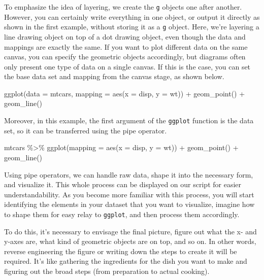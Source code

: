 \documentclass[
  a4paper,
]{book}
\newenvironment{Shaded}{\begin{snugshade}}{\end{snugshade}}
\newcommand{\AttributeTok}[1]{\textcolor[rgb]{0.40,0.45,0.13}{#1}}
\newcommand{\FunctionTok}[1]{\textcolor[rgb]{0.28,0.35,0.67}{#1}}
\newcommand{\NormalTok}[1]{\textcolor[rgb]{0.00,0.23,0.31}{#1}}
\newcommand{\SpecialCharTok}[1]{\textcolor[rgb]{0.37,0.37,0.37}{#1}}
\begin{document}
To emphasize the idea of layering, we create the \texttt{g} objects one
after another. However, you can certainly write everything in one
object, or output it directly as shown in the first example, without
storing it as a \texttt{g} object. Here, we're layering a line drawing
object on top of a dot drawing object, even though the data and mappings
are exactly the same. If you want to plot different data on the same
canvas, you can specify the geometric objects accordingly, but diagrams
often only present one type of data on a single canvas. If this is the
case, you can set the base data set and mapping from the canvas stage,
as shown below.

\begin{Shaded}
\begin{Highlighting}[]
\FunctionTok{ggplot}\NormalTok{(}\AttributeTok{data =}\NormalTok{ mtcars, }\AttributeTok{mapping =} \FunctionTok{aes}\NormalTok{(}\AttributeTok{x =}\NormalTok{ disp, }\AttributeTok{y =}\NormalTok{ wt)) }\SpecialCharTok{+}
  \FunctionTok{geom\_point}\NormalTok{() }\SpecialCharTok{+}
  \FunctionTok{geom\_line}\NormalTok{()}
\end{Highlighting}
\end{Shaded}

Moreover, in this example, the first argument of the \texttt{ggplot}
function is the data set, so it can be transferred using the pipe
operator.

\begin{Shaded}
\begin{Highlighting}[]
\NormalTok{mtcars }\SpecialCharTok{\%\textgreater{}\%}
  \FunctionTok{ggplot}\NormalTok{(}\AttributeTok{mapping =} \FunctionTok{aes}\NormalTok{(}\AttributeTok{x =}\NormalTok{ disp, }\AttributeTok{y =}\NormalTok{ wt)) }\SpecialCharTok{+}
  \FunctionTok{geom\_point}\NormalTok{() }\SpecialCharTok{+}
  \FunctionTok{geom\_line}\NormalTok{()}
\end{Highlighting}
\end{Shaded}

Using pipe operators, we can handle raw data, shape it into the
necessary form, and visualize it. This whole process can be displayed on
our script for easier understandability. As you become more familiar
with this process, you will start identifying the elements in your
dataset that you want to visualize, imagine how to shape them for easy
relay to \texttt{ggplot}, and then process them accordingly.

To do this, it's necessary to envisage the final picture, figure out
what the x- and y-axes are, what kind of geometric objects are on top,
and so on. In other words, reverse engineering the figure or writing
down the steps to create it will be required. It's like gathering the
ingredients for the dish you want to make and figuring out the broad
steps (from preparation to actual cooking).
\end{document}
